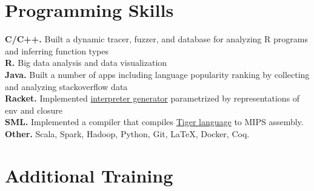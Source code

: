 \documentclass[margin,line]{resume}
\begin{document}
\begin{resume}
    \section{\mysidestyle Programming Skills} 

    \textbf{C/C++.} Built a dynamic tracer, fuzzer, and database for analyzing R programs and inferring function types\\[\mymedskip]
    \textbf{R.}  Big data analysis and data visualization\\[\mymedskip]
    \textbf{Java.} Built a number of apps including language popularity ranking by collecting and analyzing stackoverflow data\\[\mymedskip]
    \textbf{Racket.} Implemented \href{https://github.com/hyeyoungshin/hy_eopl}{interpreter generator} parametrized by representations of env and closure\\[\mymedskip]
    \textbf{SML.} Implemented a compiler that compiles
    \href{https://www.cs.princeton.edu/~appel/modern/ml/}{Tiger language} to
         {\small MIPS} assembly.\\[\mymedskip]
         \textbf{Other.} Scala, Spark, Hadoop, Python, Git, \LaTeX, Docker, Coq.





\section{\mysidestyle Additional Training}


\end{resume}
\end{document}
